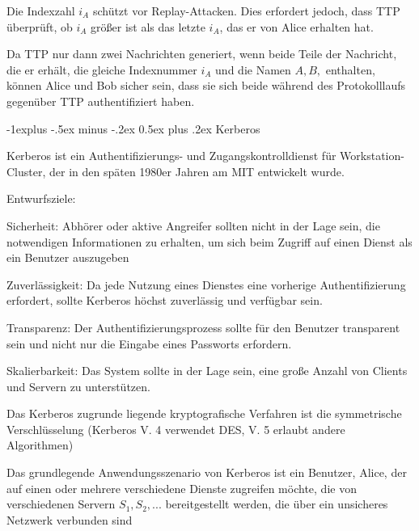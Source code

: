 \documentclass[a4paper]{article}
\makeatletter
\renewcommand{\subsection}{\@startsection{subsection}{2}{0mm}%
 {-1explus -.5ex minus -.2ex}%
 {0.5ex plus .2ex}%
 {\normalfont\normalsize\bfseries}}
\makeatother
\begin{document}
\begin{multicols}{3}
\begin{itemize*}
            \begin{itemize*}
                  \item Die Indexzahl $i_A$ schützt vor Replay-Attacken. Dies erfordert jedoch, dass TTP überprüft, ob $i_A$ größer ist als das letzte $i_A$, das er von Alice erhalten hat.
                  \item Da TTP nur dann zwei Nachrichten generiert, wenn beide Teile der Nachricht, die er erhält, die gleiche Indexnummer $i_A$ und die Namen $A, B,$ enthalten, können Alice und Bob sicher sein, dass sie sich beide während des Protokolllaufs gegenüber TTP authentifiziert haben.
            \end{itemize*}
      \end{itemize*}

      \subsection{Kerberos}
      \begin{itemize*}
            \item Kerberos ist ein Authentifizierungs- und Zugangskontrolldienst für Workstation-Cluster, der in den späten 1980er Jahren am MIT entwickelt wurde.
            \item Entwurfsziele:
            \begin{itemize*}
                  \item Sicherheit: Abhörer oder aktive Angreifer sollten nicht in der Lage sein, die notwendigen Informationen zu erhalten, um sich beim Zugriff auf einen Dienst als ein Benutzer auszugeben
                  \item Zuverlässigkeit: Da jede Nutzung eines Dienstes eine vorherige Authentifizierung erfordert, sollte Kerberos höchst zuverlässig und verfügbar sein.
                  \item Transparenz: Der Authentifizierungsprozess sollte für den Benutzer transparent sein und nicht nur die Eingabe eines Passworts erfordern.
                  \item Skalierbarkeit: Das System sollte in der Lage sein, eine große Anzahl von Clients und Servern zu unterstützen.
            \end{itemize*}
            \item Das Kerberos zugrunde liegende kryptografische Verfahren ist die symmetrische Verschlüsselung (Kerberos V. 4 verwendet DES, V. 5 erlaubt andere Algorithmen)
            \item Das grundlegende Anwendungsszenario von Kerberos ist ein Benutzer, Alice, der auf einen oder mehrere verschiedene Dienste zugreifen möchte, die von verschiedenen Servern $S_1, S_2, ...$ bereitgestellt werden, die über ein unsicheres Netzwerk verbunden sind

\end{itemize*}
\end{multicols}
\end{document}
